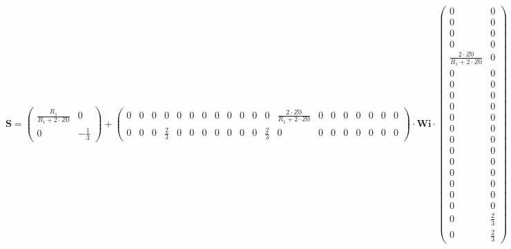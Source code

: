 \documentclass[10pt]{article} \usepackage{amsmath} \usepackage{bbold}
\begin{document}
\begin{equation} \mathbf{S} = \left(\begin{smallmatrix}
\frac{R_1}{R_1+2\cdot Z0} & 0 \\ 0 & -\frac{1}{3}
\end{smallmatrix}\right) + \left(\begin{smallmatrix} 0 & 0 & 0 & 0 & 0
& 0 & 0 & 0 & 0 & 0 & 0 & 0 & \frac{2\cdot Z0}{R_1+2\cdot Z0} & 0 & 0
& 0 & 0 & 0 & 0 & 0 \\ 0 & 0 & 0 & \frac{2}{3} & 0 & 0 & 0 & 0 & 0 & 0
& 0 & \frac{2}{3} & 0 & 0 & 0 & 0 & 0 & 0 & 0 & 0
\end{smallmatrix}\right) \cdot \mathbf{Wi}
\cdot\left(\begin{smallmatrix} 0 & 0 \\ 0 & 0 \\ 0 & 0 \\ 0 & 0 \\
\frac{2\cdot Z0}{R_1+2\cdot Z0} & 0 \\ 0 & 0 \\ 0 & 0 \\ 0 & 0 \\ 0 &
0 \\ 0 & 0 \\ 0 & 0 \\ 0 & 0 \\ 0 & 0 \\ 0 & 0 \\ 0 & 0 \\ 0 & 0 \\ 0
& 0 \\ 0 & 0 \\ 0 & \frac{2}{3} \\ 0 & \frac{2}{3}
\end{smallmatrix}\right) \end{equation}
\end{document}
